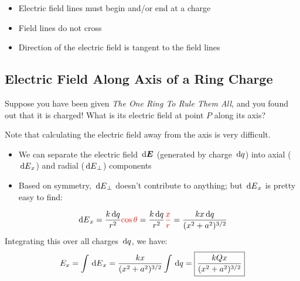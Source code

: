 \begin{center}
\end{center}
\begin{itemize}
\item Electric field lines must begin and/or end at a charge
\item Field lines do not cross
\item Direction of the electric field is tangent to the field lines
\end{itemize}




\subsection{Electric Field Along Axis of a Ring Charge}

Suppose you have been given \emph{The One Ring To Rule Them All}, and you
found out that it is charged! What is its electric field at point $P$ along
its axis?
\begin{center}
\end{center}
Note that calculating the electric field away from the axis is very
difficult.






\begin{center}
\end{center}

\begin{itemize}
\item We can separate the electric field $\dl{\bm E}$ (generated by charge
  $\dl q$) into axial ($\dl E_x$) and radial ($\dl E_\perp$) components
\item Based on symmetry, $\dl E_\perp$ doesn't contribute to anything; but
  $\dl E_x$ is pretty easy to find:
\end{itemize}
\begin{equation}
  \dl E_x =\frac{k\dl q}{r^2}{\color{red}\cos\theta}
  =\frac{k\dl q}{r^2}{\color{red}\frac xr}
  =\frac{kx\dl q}{(x^2+a^2)^{3/2}}
\end{equation}
Integrating this over all charges $\dl q$, we have:
\begin{equation} 
    E_x          
    =\int \dl E_x       
    =\frac{kx}{(x^2+a^2)^{3/2}}\int \dl q=\boxed{\frac{kQx}{(x^2+a^2)^{3/2}}}
\end{equation}                     




